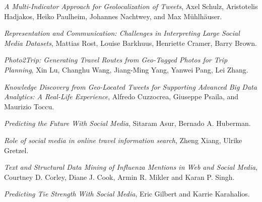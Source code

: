 \documentclass[conference]{doc}
\begin{document}
	\ifCLASSOPTIONcaptionsoff
  		\newpage
	\fi


	
	
	\begin{thebibliography}{8} %
			\emph{A Multi-Indicator Approach for Geolocalization of Tweets}, Axel Schulz,
			Aristotelis Hadjakos, Heiko Paulheim, Johannes Nachtwey, and Max Mühlhäuser.
			
			\emph{Representation and Communication: Challenges in Interpreting Large
			Social Media Datasets}, Mattias Rost, Louise Barkhuus, Henriette Cramer, Barry
			Brown.
			
			\emph{Photo2Trip: Generating Travel Routes from Geo-Tagged Photos for Trip
			Planning}, Xin Lu, Changhu Wang, Jiang-Ming Yang, Yanwei Pang, Lei Zhang.
			
			\emph{Knowledge Discovery from Geo-Located Tweets for Supporting Advanced Big
			Data Analytics: A Real-Life Experience}, Alfredo Cuzzocrea, Giuseppe Psaila,
			and Maurizio Toccu.
			
			\emph{Predicting the Future With Social Media}, Sitaram Asur, Bernado A.
			Huberman.
			
			\emph{Role of social media in online travel information search}, Zheng Xiang,
			Ulrike Gretzel.
			
			\emph{Text and Structural Data Mining of Influenza Mentions in Web and Social
			Media}, Courtney D. Corley, Diane J. Cook, Armin R. Mikler and Karan P. Singh.
			
			\emph{Predicting Tie Strength With Social Media}, Eric Gilbert and Karrie
			Karahalios.		
	\end{thebibliography}
	
	
\end{document}
